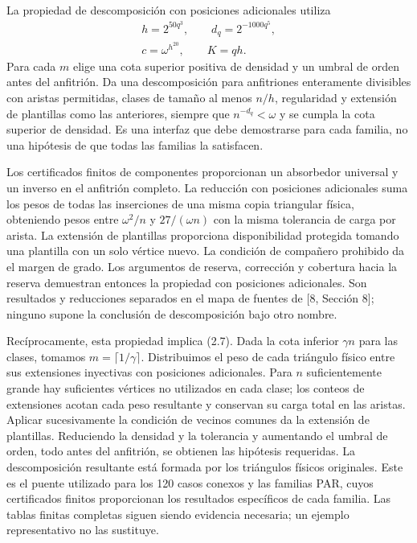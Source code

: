 \documentclass[spanish,11pt,a4paper]{article}
\begin{document}
La propiedad de descomposición con posiciones adicionales utiliza \[\begin{gathered}
h=2^{50q^3},\qquad d_q=2^{-1000q^5},\\
c=\omega^{h^{20}},\qquad K=qh.
\end{gathered}\] Para cada \(m\) elige una cota superior positiva de densidad y un umbral de orden antes del anfitrión. Da una descomposición para anfitriones enteramente divisibles con aristas permitidas, clases de tamaño al menos \(n/h\), regularidad y extensión de plantillas como las anteriores, siempre que \(n^{-d_q}<\omega\) y se cumpla la cota superior de densidad. Es una interfaz que debe demostrarse para cada familia, no una hipótesis de que todas las familias la satisfacen.

Los certificados finitos de componentes proporcionan un absorbedor universal y un inverso en el anfitrión completo. La reducción con posiciones adicionales suma los pesos de todas las inserciones de una misma copia triangular física, obteniendo pesos entre \(\omega^2/n\) y \(27/(\omega n)\) con la misma tolerancia de carga por arista. La extensión de plantillas proporciona disponibilidad protegida tomando una plantilla con un solo vértice nuevo. La condición de compañero prohibido da el margen de grado. Los argumentos de reserva, corrección y cobertura hacia la reserva demuestran entonces la propiedad con posiciones adicionales. Son resultados y reducciones separados en el mapa de fuentes de {[}8, Sección 8{]}; ninguno supone la conclusión de descomposición bajo otro nombre.

Recíprocamente, esta propiedad implica (2.7). Dada la cota inferior \(\gamma n\) para las clases, tomamos \(m=\lceil1/\gamma\rceil\). Distribuimos el peso de cada triángulo físico entre sus extensiones inyectivas con posiciones adicionales. Para \(n\) suficientemente grande hay suficientes vértices no utilizados en cada clase; los conteos de extensiones acotan cada peso resultante y conservan su carga total en las aristas. Aplicar sucesivamente la condición de vecinos comunes da la extensión de plantillas. Reduciendo la densidad y la tolerancia y aumentando el umbral de orden, todo antes del anfitrión, se obtienen las hipótesis requeridas. La descomposición resultante está formada por los triángulos físicos originales. Este es el puente utilizado para los 120 casos conexos y las familias PAR, cuyos certificados finitos proporcionan los resultados específicos de cada familia. Las tablas finitas completas siguen siendo evidencia necesaria; un ejemplo representativo no las sustituye.
\end{document}
